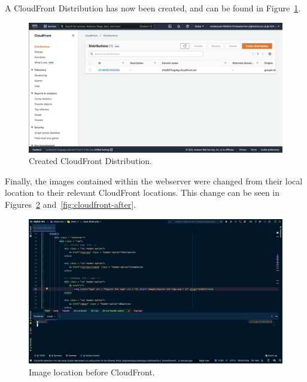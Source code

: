 \clearpage
A CloudFront Distribution has now been created, and can be found in Figure~\ref{fig:cloudfront-created}.

\begin{figure}[!htbp]
    \centering
    \includegraphics[width=\textwidth]{resources/cloudfront/cloudfront-created}
    \caption{Created CloudFront Distribution.}
    \label{fig:cloudfront-created}
\end{figure}

Finally, the images contained within the webserver were changed from their local location to their relevant CloudFront
locations.
This change can be seen in Figures~\ref{fig:cloudfront-before} and~\ref{fig:cloudfront-after}.

\begin{figure}[!htbp]
    \centering
    \includegraphics[width=\textwidth]{resources/cloudfront/cloudfront-before}
    \caption{Image location before CloudFront.}
    \label{fig:cloudfront-before}
\end{figure}

